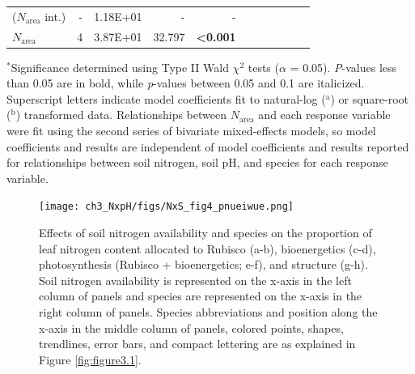 \begin{landscape}
\begin{table}
{\begin{tabular}{p{2.5cm}p{0.5cm}p{2cm}p{1.5cm}p{1.5cm}p{2cm}p{1.5cm}p{1.5cm}p{2cm}p{1.5cm}p{1.5cm}}
        ($N_\mathrm{area}$ int.) & \multicolumn{1}{r}{-}
        & \multicolumn{1}{r}{1.18E+01} & \multicolumn{1}{r}{-} & \multicolumn{1}{r}{-}
        &&&&&& 
        \\

        $N_\mathrm{area}$ & \multicolumn{1}{r}{4}
        & \multicolumn{1}{r}{3.87E+01} & \multicolumn{1}{r}{32.797} & \multicolumn{1}{r}{\textbf{<0.001}}
        &&&&&
        \\
        \hline
    \end{tabular}}
    \label{tab:table3.4}
    \end{table}
\begin{singlespace}
    \noindent $^*$Significance determined using Type II Wald $\chi^{2}$ tests ($\alpha$ = 0.05). \textit{P}-values less than 0.05 are in bold, while \textit{p}-values between 0.05 and 0.1 are italicized. Superscript letters indicate model coefficients fit to natural-log ($^\mathrm{a}$) or square-root ($^\mathrm{b}$) transformed data. Relationships between $N_\mathrm{area}$ and each response variable were fit using the second series of bivariate mixed-effects models, so model coefficients and results are independent of model coefficients and results reported for relationships between soil nitrogen, soil pH, and species for each response variable.
\end{singlespace}
\end{landscape}
\clearpage

\newpage
\begin{figure}
    \texttt{[image: ch3\_NxpH/figs/NxS\_fig4\_pnueiwue.png]}
    \centering
    \caption[Effects of soil N availability, species, and leaf N content on tradeoffs between nitrogen and water use]{Effects of soil nitrogen availability and species on the proportion of leaf nitrogen content allocated to Rubisco (a-b), bioenergetics (c-d), photosynthesis (Rubisco + bioenergetics; e-f), and structure (g-h). Soil nitrogen availability is represented on the x-axis in the left column of panels and species are represented on the x-axis in the right column of panels. Species abbreviations and position along the x-axis in the middle column of panels, colored points, shapes, trendlines, error bars, and compact lettering are as explained in Figure \ref{fig:figure3.1}.}
    \label{fig:figure3.4}
\end{figure}
\clearpage

